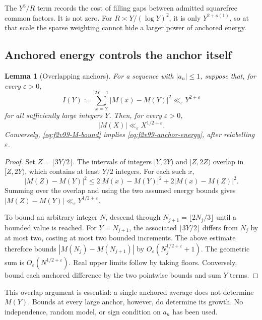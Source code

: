 \documentclass[11pt]{article}
\newtheorem{lemma}[theorem]{Lemma}
\theoremstyle{definition}
\theoremstyle{remark}
\begin{document}
The \(Y^3/R\) term records the cost of filling gaps between admitted
squarefree common factors.  It is not zero.  For
\(R\asymp Y/(\log Y)^2\), it is only \(Y^{2+o(1)}\), so at
that scale the sparse weighting cannot hide a larger power of anchored
energy.

\subsection{Anchored energy controls the anchor itself}

\begin{lemma}[Overlapping anchors]
\label{lem:f2v99-anchors}
For a sequence with \(|a_n|\le1\), suppose that, for every
\(\varepsilon>0\),
\begin{equation}
 I(Y):=\sum_{x=Y}^{2Y-1}|M(x)-M(Y)|^2
                  \ll_\varepsilon Y^{2+\varepsilon}
 \label{eq:f2v99-anchor-energy}
\end{equation}
for all sufficiently large integers \(Y\).  Then, for every
\(\varepsilon>0\),
\begin{equation}
 |M(X)|\ll_\varepsilon X^{1/2+\varepsilon}.
 \label{eq:f2v99-M-bound}
\end{equation}
Conversely, \eqref{eq:f2v99-M-bound} implies
\eqref{eq:f2v99-anchor-energy}, after relabelling \(\varepsilon\).
\end{lemma}

\begin{proof}
Set \(Z=\lfloor3Y/2\rfloor\).  The intervals of integers
\([Y,2Y)\) and \([Z,2Z)\) overlap in \([Z,2Y)\), which
contains at least \(Y/2\) integers.  For each such \(x\),
\[
 |M(Z)-M(Y)|^2
 \le2|M(x)-M(Y)|^2+2|M(x)-M(Z)|^2.
\]
Summing over the overlap and using the two assumed energy bounds
gives \(|M(Z)-M(Y)|\ll_\varepsilon Y^{1/2+\varepsilon}\).

To bound an arbitrary integer \(N\), descend through
\(N_{j+1}=\lfloor2N_j/3\rfloor\) until a bounded value is reached.
For \(Y=N_{j+1}\), the associated \(\lfloor3Y/2\rfloor\) differs
from \(N_j\) by at most two, costing at most two bounded increments.
The above estimate therefore bounds
\(|M(N_j)-M(N_{j+1})|\) by
\(O_\varepsilon(N_j^{1/2+\varepsilon}+1)\).
The geometric sum is \(O_\varepsilon(N^{1/2+\varepsilon})\).
Real upper limits follow by taking floors.  Conversely, bound each
anchored difference by the two pointwise bounds and sum \(Y\) terms.
\end{proof}

This overlap argument is essential: a single anchored average does
not determine \(M(Y)\).  Bounds at every large anchor, however, do
determine its growth.  No independence, random model, or sign condition
on \(a_n\) has been used.
\end{document}
